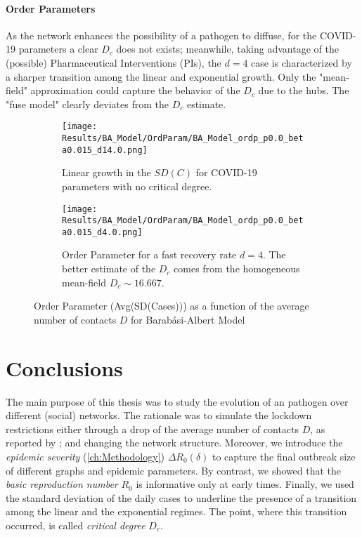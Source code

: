 \documentclass[a4paper,10pt]{book} %
\theoremstyle{definition}
\begin{document}
\subsubsection*{Order Parameters}
As the network enhances the possibility of a pathogen to diffuse, for the COVID-19 parameters a clear $D_c$ does not exists; meanwhile, taking advantage of the (possible) Pharmaceutical Interventions (PIs), the $d = 4$ case is characterized by a sharper transition among the linear and exponential growth. Only the "mean-field" approximation could capture the behavior of the $ D_c$ due to the hubs. The "fuse model" clearly deviates from the $ D_c$ estimate. 
\begin{figure}[t]
	\begin{subfigure}[t]{0.48\linewidth}
		\centering
		\texttt{[image: Results/BA\_Model/OrdParam/BA\_Model\_ordp\_p0.0\_beta0.015\_d14.0.png]}
		\caption{Linear growth in the $SD(C)$ for COVID-19 parameters with no critical degree.}
		\label{fig:Ordp_BA_d14}
	\end{subfigure}
	\hfill
	\begin{subfigure}[t]{0.48\linewidth}
		\centering
		\texttt{[image: Results/BA\_Model/OrdParam/BA\_Model\_ordp\_p0.0\_beta0.015\_d4.0.png]}
		\caption{Order Parameter for a fast recovery rate $ d = 4$. The better estimate of the $ D_c$ comes from the homogeneous mean-field $ D_c \sim 16.667$.}
		\label{fig:Ordp_BA_COVID_d1}
	\end{subfigure}
	\caption{Order Parameter (Avg(SD(Cases))) as a function of the average number of contacts $ D$ for Barabási-Albert Model}
	\label{fig:Ordp_BA_COVID}
\end{figure}


\chapter{Conclusions}
The main purpose of this thesis was to study the evolution of an pathogen over different (social) networks. The rationale was to simulate the lockdown restrictions either through a drop of the average number of contacts $D$, as reported by \cite{Liu::2021_Review_SContactPattern}; and changing the network structure. Moreover, we introduce the \textit{epidemic severity} (\autoref{ch:Methodology}) $ \Delta R_0 (\delta)$ to capture the final outbreak size of different graphs and epidemic parameters. By contrast, we showed that the \textit{basic reproduction number} $ R_0 $ is informative only at early times.
Finally, we used the standard deviation of the daily cases to underline the presence of a transition among the linear and the exponential regimes. The point, where this transition occurred, is called \textit{critical degree}  $D_c$.
\end{document}
